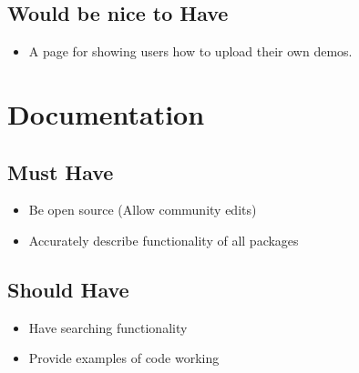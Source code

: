 \documentclass{l4proj}
\begin{document}
\begin{appendices}
\subsection{Would be nice to Have}
\begin{itemize}
    \item A page for showing users how to upload their own demos.
\end{itemize}


\section{Documentation}
\subsection{Must Have}
\begin{itemize}
    \item Be open source (Allow community edits)
    \item Accurately describe functionality of all packages
\end{itemize}
\subsection{Should Have}
\begin{itemize}
    \item Have searching functionality
    \item Provide examples of code working
\end{itemize}
\end{appendices}






\end{document}
